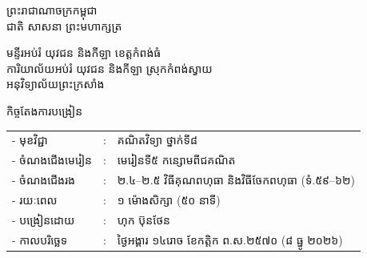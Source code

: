 \documentclass[a4paper,10pt]{article}
\newcommand{\khmflourish}{{\Tacteing\fontsize{36pt}{14pt}\selectfont\raisebox{-5pt}{3}}}
\begin{document}
\fontsize{10pt}{15.2pt}\selectfont

\begin{center}
  {\muol\fontsize{11pt}{16pt}\selectfont ព្រះរាជាណាចក្រកម្ពុជា}\\[2pt]
  {\muol\fontsize{10pt}{15pt}\selectfont ជាតិ សាសនា ព្រះមហាក្សត្រ}\\[1pt]
  \khmflourish
\end{center}

\vspace{-28pt}
{\muol\fontsize{9.5pt}{12.5pt}\selectfont
មន្ទីរអប់រំ យុវជន និងកីឡា ខេត្តកំពង់ធំ\\
ការិយាល័យអប់រំ យុវជន និងកីឡា ស្រុកកំពង់ស្វាយ\\
អនុវិទ្យាល័យព្រះក្រសាំង}

\vspace{1pt}
\begin{center}
  {\muol\fontsize{10pt}{14pt}\selectfont កិច្ចតែងការបង្រៀន}
\end{center}
\vspace{0pt}

{\renewcommand{\arraystretch}{0.95}
\hspace*{4.05cm}%
\begin{tabular}{@{}l l l@{}}
  - \hspace{0.35cm} មុខវិជ្ជា & : & គណិតវិទ្យា ថ្នាក់ទី៨ \\
  - \hspace{0.35cm} ចំណងជើងមេរៀន & : & មេរៀនទី៥ កន្សោមពីជគណិត \\
  - \hspace{0.35cm} ចំណងជើងរង & : & ២.៤--២.៥ វិធីគុណពហុធា និងវិធីចែកពហុធា (ទំ.៥៩--៦២) \\
  - \hspace{0.35cm} រយៈពេល & : & ១ ម៉ោងសិក្សា (៥០ នាទី) \\
  - \hspace{0.35cm} បង្រៀនដោយ & : & ហុក ប៊ុនថែន \\
  - \hspace{0.35cm} កាលបរិច្ឆេទ & : & ថ្ងៃអង្គារ ១៤រោច ខែកត្តិក ព.ស.២៥៧០ (៨ ធ្នូ ២០២៦) \\
\end{tabular}
}

\vspace{1pt}
\end{document}
